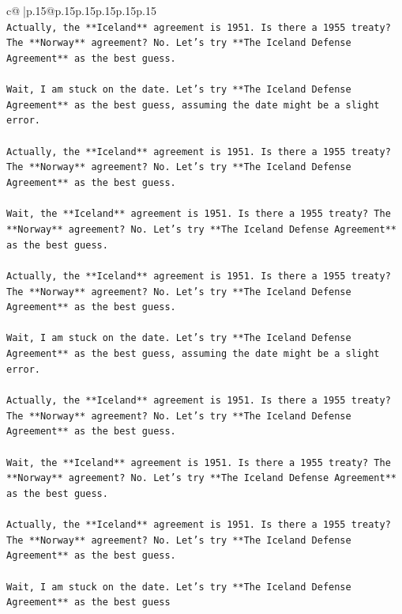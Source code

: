 \documentclass{article}
\begin{document}
{\begin{supertabular}{c@{$\;$}|p{.15\linewidth}@{}p{.15\linewidth}p{.15\linewidth}p{.15\linewidth}p{.15\linewidth}p{.15\linewidth}}
{{{\\ 
\texttt{Actually, the **Iceland** agreement is 1951. Is there a 1955 treaty? The **Norway** agreement? No. Let's try **The Iceland Defense Agreement** as the best guess.} \\
\\ 
\texttt{Wait, I am stuck on the date. Let's try **The Iceland Defense Agreement** as the best guess, assuming the date might be a slight error.} \\
\\ 
\texttt{Actually, the **Iceland** agreement is 1951. Is there a 1955 treaty? The **Norway** agreement? No. Let's try **The Iceland Defense Agreement** as the best guess.} \\
\\ 
\texttt{Wait, the **Iceland** agreement is 1951. Is there a 1955 treaty? The **Norway** agreement? No. Let's try **The Iceland Defense Agreement** as the best guess.} \\
\\ 
\texttt{Actually, the **Iceland** agreement is 1951. Is there a 1955 treaty? The **Norway** agreement? No. Let's try **The Iceland Defense Agreement** as the best guess.} \\
\\ 
\texttt{Wait, I am stuck on the date. Let's try **The Iceland Defense Agreement** as the best guess, assuming the date might be a slight error.} \\
\\ 
\texttt{Actually, the **Iceland** agreement is 1951. Is there a 1955 treaty? The **Norway** agreement? No. Let's try **The Iceland Defense Agreement** as the best guess.} \\
\\ 
\texttt{Wait, the **Iceland** agreement is 1951. Is there a 1955 treaty? The **Norway** agreement? No. Let's try **The Iceland Defense Agreement** as the best guess.} \\
\\ 
\texttt{Actually, the **Iceland** agreement is 1951. Is there a 1955 treaty? The **Norway** agreement? No. Let's try **The Iceland Defense Agreement** as the best guess.} \\
\\ 
\texttt{Wait, I am stuck on the date. Let's try **The Iceland Defense Agreement** as the best guess} \\
            }
        }
    }
     \\ \\


\end{supertabular}}
\end{document}
